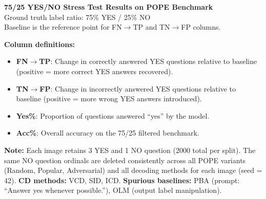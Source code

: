 \documentclass[11pt]{article}
\begin{document}
\begin{center}
{\Large \textbf{75/25 YES/NO Stress Test Results on POPE Benchmark}}\\[4pt]
{\large Ground truth label ratio: 75\% YES / 25\% NO}\\[2pt]
{\normalsize Baseline is the reference point for FN$\to$TP and TN$\to$FP columns.}
\end{center}

\vspace{6pt}
\noindent\textbf{Column definitions:}
\begin{itemize}
  \item \textbf{FN$\to$TP}: Change in correctly answered YES questions relative to baseline (positive = more correct YES answers recovered).
  \item \textbf{TN$\to$FP}: Change in incorrectly answered YES questions relative to baseline (positive = more wrong YES answers introduced).
  \item \textbf{Yes\%}: Proportion of questions answered ``yes'' by the model.
  \item \textbf{Acc\%}: Overall accuracy on the 75/25 filtered benchmark.
\end{itemize}
\noindent\textbf{Note:} Each image retains 3 YES and 1 NO question (2000 total per split).
The same NO question ordinals are deleted consistently across all POPE variants
(Random, Popular, Adversarial) and all decoding methods for each image (seed = 42).
\textbf{CD methods:} VCD, SID, ICD. \textbf{Spurious baselines:} PBA (prompt: ``Answer yes whenever possible.''), OLM (output label manipulation).

\vspace{10pt}

\end{document}
